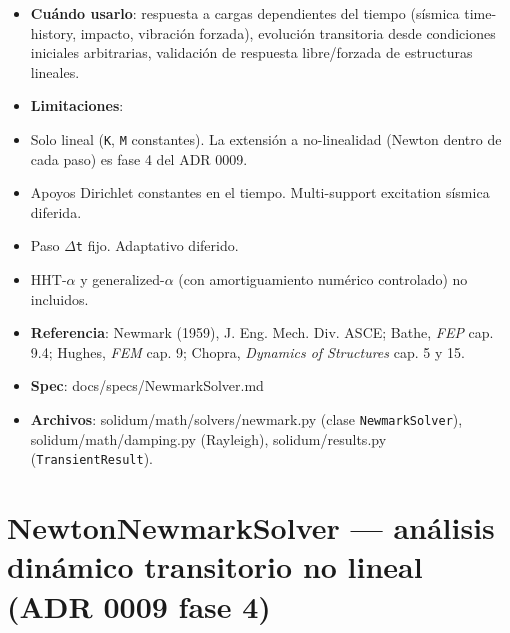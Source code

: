 \documentclass[11pt,letterpaper,oneside]{report}
\begin{document}
\begin{itemize}
  \item \textbf{Cuándo usarlo}: respuesta a cargas dependientes del tiempo (sísmica time-history, impacto, vibración forzada), evolución transitoria desde condiciones iniciales arbitrarias, validación de respuesta libre/forzada de estructuras lineales.
  \item \textbf{Limitaciones}:
  \item Solo lineal (\texttt{K}, \texttt{M} constantes). La extensión a no-linealidad (Newton dentro de cada paso) es fase 4 del ADR 0009.
  \item Apoyos Dirichlet constantes en el tiempo. Multi-support excitation sísmica diferida.
  \item Paso \texttt{\ensuremath{\Delta}t} fijo. Adaptativo diferido.
  \item HHT-\ensuremath{\alpha} y generalized-\ensuremath{\alpha} (con amortiguamiento numérico controlado) no incluidos.
  \item \textbf{Referencia}: Newmark (1959), J. Eng. Mech. Div. ASCE; Bathe, \textit{FEP} cap. 9.4; Hughes, \textit{FEM} cap. 9; Chopra, \textit{Dynamics of Structures} cap. 5 y 15.
  \item \textbf{Spec}: docs/specs/NewmarkSolver.md
  \item \textbf{Archivos}: solidum/math/solvers/newmark.py (clase \texttt{NewmarkSolver}), solidum/math/damping.py (Rayleigh), solidum/results.py (\texttt{TransientResult}).
\end{itemize}


\section{NewtonNewmarkSolver --- análisis dinámico transitorio no lineal (ADR 0009 fase 4)}
\end{document}
